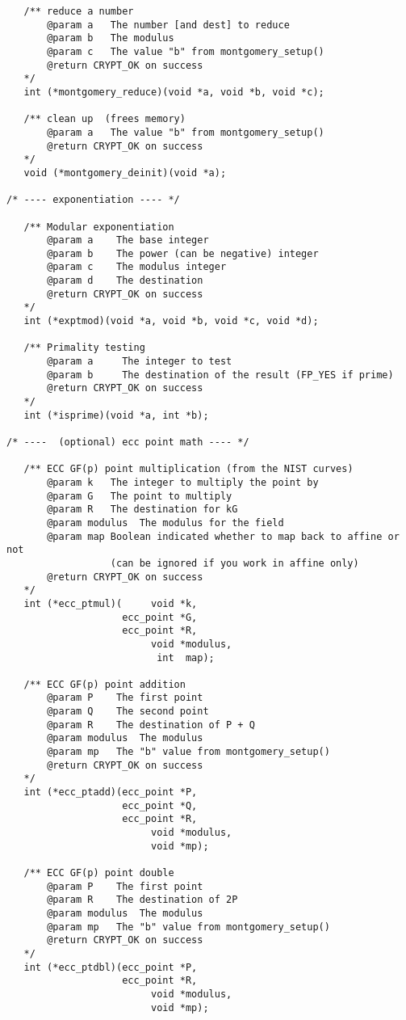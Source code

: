 \documentclass[synpaper]{book}
\begin{document}
\begin{small}
\begin{verbatim}
   /** reduce a number
       @param a   The number [and dest] to reduce
       @param b   The modulus
       @param c   The value "b" from montgomery_setup()
       @return CRYPT_OK on success
   */
   int (*montgomery_reduce)(void *a, void *b, void *c);

   /** clean up  (frees memory)
       @param a   The value "b" from montgomery_setup()
       @return CRYPT_OK on success
   */      
   void (*montgomery_deinit)(void *a);

/* ---- exponentiation ---- */

   /** Modular exponentiation
       @param a    The base integer
       @param b    The power (can be negative) integer
       @param c    The modulus integer
       @param d    The destination
       @return CRYPT_OK on success
   */
   int (*exptmod)(void *a, void *b, void *c, void *d);

   /** Primality testing
       @param a     The integer to test
       @param b     The destination of the result (FP_YES if prime)
       @return CRYPT_OK on success
   */
   int (*isprime)(void *a, int *b);

/* ----  (optional) ecc point math ---- */

   /** ECC GF(p) point multiplication (from the NIST curves)
       @param k   The integer to multiply the point by
       @param G   The point to multiply
       @param R   The destination for kG  
       @param modulus  The modulus for the field
       @param map Boolean indicated whether to map back to affine or not 
                  (can be ignored if you work in affine only)
       @return CRYPT_OK on success
   */
   int (*ecc_ptmul)(     void *k, 
                    ecc_point *G, 
                    ecc_point *R, 
                         void *modulus, 
                          int  map);

   /** ECC GF(p) point addition 
       @param P    The first point
       @param Q    The second point
       @param R    The destination of P + Q
       @param modulus  The modulus
       @param mp   The "b" value from montgomery_setup()
       @return CRYPT_OK on success
   */
   int (*ecc_ptadd)(ecc_point *P, 
                    ecc_point *Q, 
                    ecc_point *R, 
                         void *modulus, 
                         void *mp);

   /** ECC GF(p) point double 
       @param P    The first point
       @param R    The destination of 2P
       @param modulus  The modulus
       @param mp   The "b" value from montgomery_setup()
       @return CRYPT_OK on success
   */
   int (*ecc_ptdbl)(ecc_point *P, 
                    ecc_point *R, 
                         void *modulus, 
                         void *mp);


\end{verbatim}
\end{small}
\end{document}
